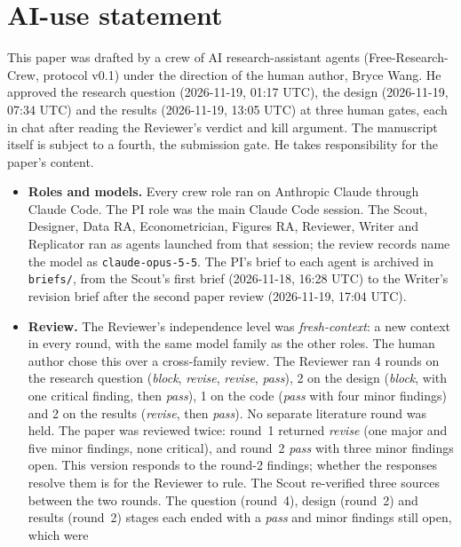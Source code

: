 \section*{AI-use statement}

This paper was drafted by a crew of AI research-assistant agents
(Free-Research-Crew, protocol v0.1) under the direction of the human author, Bryce Wang.
He approved the research question (2026-11-19, 01:17 UTC), the design (2026-11-19, 07:34 UTC)
and the results (2026-11-19, 13:05 UTC) at three human gates, each in chat after reading the
Reviewer's verdict and kill argument. The manuscript itself is subject to a fourth, the
submission gate. He takes responsibility for the paper's content.

\begin{itemize}
  \item \textbf{Roles and models.} Every crew role ran on Anthropic Claude through Claude
        Code. The PI role was the main Claude Code session. The Scout, Designer, Data RA,
        Econometrician, Figures RA, Reviewer, Writer and Replicator ran as agents launched
        from that session; the review records name the model as \texttt{claude-opus-5-5}.
        The PI's brief to each agent is archived in \texttt{briefs/}, from the Scout's first
        brief (2026-11-18, 16:28 UTC) to the Writer's revision brief after the second paper review
        (2026-11-19, 17:04 UTC).
  \item \textbf{Review.} The Reviewer's independence level was \emph{fresh-context}: a new
        context in every round, with the same model family as the other roles. The human
        author chose this over a cross-family review. The Reviewer ran 4 rounds on the
        research question (\emph{block}, \emph{revise}, \emph{revise}, \emph{pass}), 2 on the
        design (\emph{block}, with one critical finding, then \emph{pass}), 1 on the code
        (\emph{pass} with four minor findings) and 2 on the results (\emph{revise}, then
        \emph{pass}). No separate literature round was held. The paper was reviewed twice:
        round~1 returned \emph{revise} (one major and five minor findings, none critical),
        and round~2 \emph{pass} with three minor findings open. This version responds to the
        round-2 findings; whether the responses resolve them is for the Reviewer to rule. The
        Scout re-verified three sources between the two rounds. The question (round~4), design (round~2) and results (round~2)
        stages each ended with a \emph{pass} and minor findings still open, which were

\end{itemize}
